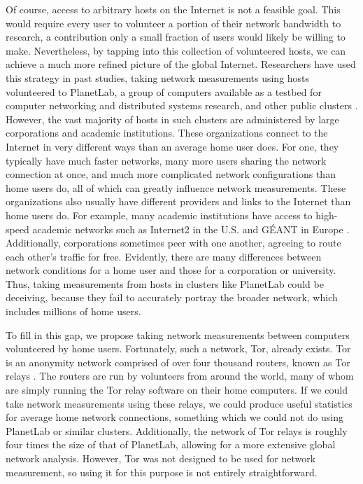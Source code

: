 \documentclass[twocolumn,11pt]{article}
\begin{document}
Of course, access to arbitrary hosts on the Internet is not a feasible goal. This would require every user to volunteer a portion of their network bandwidth to research, a contribution only a small fraction of users would likely be willing to make. Nevertheless, by tapping into this collection of volunteered hosts, we can achieve a much more refined picture of the global Internet. Researchers have used this strategy in past studies, taking network measurements using hosts volunteered to PlanetLab, a group of computers available as a testbed for computer networking and distributed systems research, and other public clusters \cite{PlanetLab}. However, the vast majority of hosts in such clusters are administered by large corporations and academic institutions. These organizations connect to the Internet in very different ways than an average home user does. For one, they typically have much faster networks, many more users sharing the network connection at once, and much more complicated network configurations than home users do, all of which can greatly influence network measurements. These organizations also usually have different providers and links to the Internet than home users do. For example, many academic institutions have access to high-speed academic networks such as Internet2 in the U.S. and G\'EANT in Europe \cite{Geant}. Additionally, corporations sometimes peer with one another, agreeing to route each other’s traffic for free. Evidently, there are many differences between network conditions for a home user and those for a corporation or university. Thus, taking measurements from hosts in clusters like PlanetLab could be deceiving, because they fail to accurately portray the broader network, which includes millions of home users.

To fill in this gap, we propose taking network measurements between computers volunteered by home users. Fortunately, such a network, Tor, already exists. Tor is an anonymity network comprised of over four thousand routers, known as Tor relays \cite{Tor}. The routers are run by volunteers from around the world, many of whom are simply running the Tor relay software on their home computers. If we could take network measurements using these relays, we could produce useful statistics for average home network connections, something which we could not do using PlanetLab or similar clusters. Additionally, the network of Tor relays is roughly four times the size of that of PlanetLab, allowing for a more extensive global network analysis. \cite{Tor_Metrics_Portal, PlanetLab}
However, Tor was not designed to be used for network measurement, so using it for this purpose is not entirely straightforward.  
\end{document}
